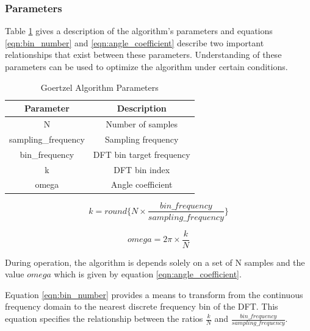 \subsubsection{Parameters}
\label{sec:goertzel_parameters}
Table \ref{tbl:goertzel_algorithm_parameters} gives a description of the algorithm's parameters and equations \ref{eqn:bin_number} and \ref{eqn:angle_coefficient} describe two important relationships that exist between these parameters. Understanding of these parameters can be used to optimize the algorithm under certain conditions.

\begin{table}[H]
	\centering
	\begin{tabular}{cc}
		\hline
		\textbf{Parameter} & \textbf{Description} \\ \hline
		N & Number of samples \\ \hline
		sampling\_frequency & Sampling frequency \\ \hline
		bin\_frequency & DFT bin target frequency \\ \hline
		k & DFT bin index \\ \hline
		omega & Angle coefficient \\ \hline
	\end{tabular}
	\caption{Goertzel Algorithm Parameters}
	\label{tbl:goertzel_algorithm_parameters}
\end{table}

\begin{equation}
k = round\{N \times \frac{bin\_frequency}{sampling\_frequency}\}
\label{eqn:bin_number}
\end{equation}

\begin{equation}
omega = 2\pi \times \frac{k}{N}
\label{eqn:angle_coefficient}
\end{equation}


During operation, the algorithm is depends solely on a set of N samples and the value $omega$ which is given by equation \ref{eqn:angle_coefficient}.

Equation \ref{eqn:bin_number} provides a means to transform from the continuous frequency domain to the nearest discrete frequency bin of the DFT. This equation specifies the relationship between the ratios $\frac{k}{N}$ and $\frac{bin\_frequency}{sampling\_frequency}$.









